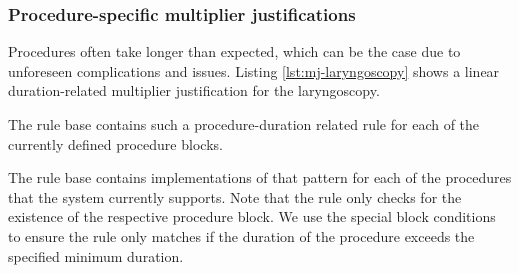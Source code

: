 \subsubsection{Procedure-specific multiplier justifications}
Procedures often take longer than expected, which can be the case due to unforeseen complications and issues.
Listing \ref{lst:mj-laryngoscopy} shows a linear duration-related multiplier justification for the laryngoscopy.


The rule base contains such a procedure-duration related rule for each of the currently defined procedure blocks.


The rule base contains implementations of that pattern for each of the procedures that the system currently supports.
Note that the rule only checks for the existence of the respective procedure block.
We use the special block conditions  to ensure the rule only matches if the duration of the procedure exceeds the specified minimum duration.


